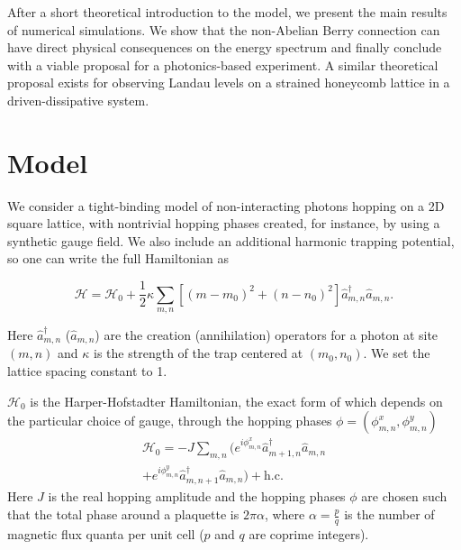 \documentclass[twocolumn, 10pt, aps, superscriptaddress, floatfix, showpacs, pra, citeautoscript]{revtex4-1}
\newcommand{\co}[2]{#2}
\renewcommand{\paragraph}{\co}
\begin{document}
\paragraph{Summary of the manuscript}
After a short theoretical introduction to the model, we present the
main results of numerical simulations. We show that the non-Abelian
Berry connection can have direct physical consequences on the energy
spectrum and finally conclude with a viable proposal for a
photonics-based experiment. A similar theoretical proposal exists for
observing Landau levels on a strained honeycomb lattice in a
driven-dissipative system.~\cite{salerno2015graphene}


\section{Model}
\label{sec:model}

We consider a tight-binding model of non-interacting photons hopping
on a 2D square lattice, with nontrivial hopping phases created, for
instance, by using a synthetic gauge field. We also include an
additional harmonic trapping potential, so one can write the full Hamiltonian as

\begin{equation}\label{eq:model}
\mathcal{H}=\mathcal{H}_0+\frac{1}{2}\kappa
\sum_{m,n}\left[(m-m_0)^{2}+(n-n_0)^{2}\right]\hat{a}_{m,n}^{\dagger}\hat{a}_{m,n}.
\end{equation}

Here $\hat{a}_{m,n}^{\dagger}$ ($\hat{a}_{m,n}$) are the creation
(annihilation) operators for a photon at site $(m,n)$ and $\kappa$ is
the strength of the trap centered at $(m_0, n_0)$. We set the lattice
spacing constant to 1.

$\mathcal{H}_0$ is the Harper-Hofstadter Hamiltonian, the exact form
of which depends on the particular choice of gauge, through the
hopping phases $\phi = (\phi_{m,n}^x, \phi_{m,n}^y)$
%
\begin{multline}\label{eq:hh_hamiltonian}
\mathcal{H}_0=-J\sum_{m,n}(e^{i \phi_{m,n}^x}\hat{a}_{m+1,n}^{\dagger}\hat{a}_{m,n}\\
+e^{i \phi_{m,n}^y}\hat{a}_{m,n+1}^{\dagger}\hat{a}_{m,n}) + \text{h.c.}
\end{multline}
Here $J$ is the real hopping amplitude and the hopping phases $\phi$
are chosen such that the total phase around a plaquette is
$2\pi\alpha$, where $\alpha = \frac{p}{q}$ is the number of magnetic
flux quanta per unit cell ($p$ and $q$ are coprime integers). 
\end{document}
